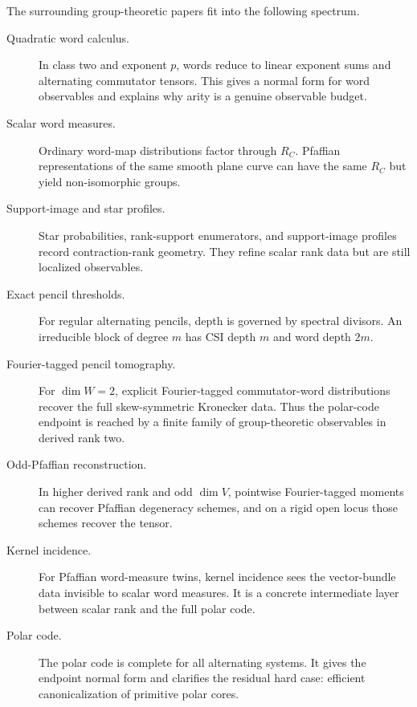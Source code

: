 \documentclass[11pt]{article}
\begin{document}
The surrounding group-theoretic papers fit into the following spectrum.

\begin{description}
\item[Quadratic word calculus.]
In class two and exponent $p$, words reduce to linear exponent sums and alternating commutator tensors. This gives a normal form for word observables and explains why arity is a genuine observable budget.

\item[Scalar word measures.]
Ordinary word-map distributions factor through $R_C$. Pfaffian representations of the same smooth plane curve can have the same $R_C$ but yield non-isomorphic groups.

\item[Support-image and star profiles.]
Star probabilities, rank-support enumerators, and support-image profiles record contraction-rank geometry. They refine scalar rank data but are still localized observables.

\item[Exact pencil thresholds.]
For regular alternating pencils, depth is governed by spectral divisors. An irreducible block of degree $m$ has CSI depth $m$ and word depth $2m$.

\item[Fourier-tagged pencil tomography.]
For $\dim W=2$, explicit Fourier-tagged commutator-word distributions recover the full skew-symmetric Kronecker data. Thus the polar-code endpoint is reached by a finite family of group-theoretic observables in derived rank two.

\item[Odd-Pfaffian reconstruction.]
In higher derived rank and odd $\dim V$, pointwise Fourier-tagged moments can recover Pfaffian degeneracy schemes, and on a rigid open locus those schemes recover the tensor.

\item[Kernel incidence.]
For Pfaffian word-measure twins, kernel incidence sees the vector-bundle data invisible to scalar word measures. It is a concrete intermediate layer between scalar rank and the full polar code.

\item[Polar code.]
The polar code is complete for all alternating systems. It gives the endpoint normal form and clarifies the residual hard case: efficient canonicalization of primitive polar cores.
\end{description}
\end{document}
